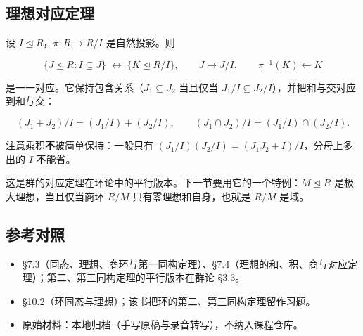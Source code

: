 \subsection{理想对应定理}


设 $I\trianglelefteq R$，$\pi:R\to R/I$ 是自然投影。则

\[
\{J\trianglelefteq R:I\subseteq J\}\;\longleftrightarrow\;\{K\trianglelefteq R/I\},
\qquad J\longmapsto J/I,\qquad \pi^{-1}(K)\longleftarrow K
\]

是一一对应。它保持包含关系（$J_1\subseteq J_2$ 当且仅当 $J_1/I\subseteq J_2/I$），并把和与交对应到和与交：

\[
(J_1+J_2)/I=(J_1/I)+(J_2/I),\qquad (J_1\cap J_2)/I=(J_1/I)\cap(J_2/I).
\]

注意乘积\textbf{不}被简单保持：一般只有 $(J_1/I)(J_2/I)=(J_1J_2+I)/I$，分母上多出的 $I$ 不能省。

这是群的对应定理在环论中的平行版本。下一节要用它的一个特例：$M\trianglelefteq R$ 是极大理想，当且仅当商环 $R/M$ 只有零理想和自身，也就是 $R/M$ 是域。

\subsection{参考对照}


\begin{itemize}
\item [DF] §7.3（同态、理想、商环与第一同构定理）、§7.4（理想的和、积、商与对应定理）；第二、第三同构定理的平行版本在群论 §3.3。
\item [DS] §10.2（环同态与理想）；该书把环的第二、第三同构定理留作习题。
\item 原始材料：本地归档（手写原稿与录音转写），不纳入课程仓库。
\end{itemize}
